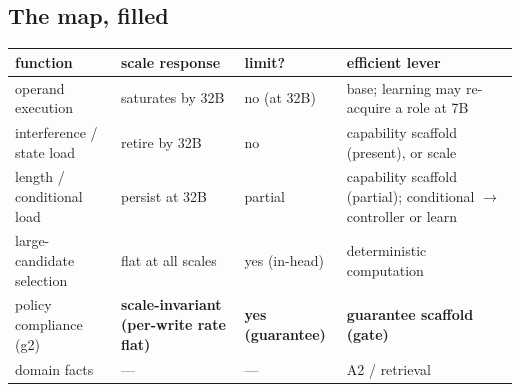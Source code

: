 \subsection{The map, filled}\label{sec:results-map}%
\begin{center}\small\begin{tabular}{p{3.1cm}p{2.8cm}p{1.4cm}p{4.4cm}}
\toprule function & scale response & limit? & efficient lever \\ \midrule
operand execution & saturates by 32B & no (at 32B) & base; learning may re-acquire a role at 7B \\
interference / state load & retire by 32B & no & capability scaffold (present), or scale \\
length / conditional load & persist at 32B & partial & capability scaffold (partial); conditional $\to$ controller or learn \\
large-candidate selection & flat at all scales & yes (in-head) & deterministic computation \\
policy compliance (g2) & \textbf{scale-invariant (per-write rate flat)} & \textbf{yes (guarantee)} & \textbf{guarantee scaffold (gate)} \\
domain facts & --- & --- & A2 / retrieval \\ \bottomrule
\end{tabular}\end{center}

